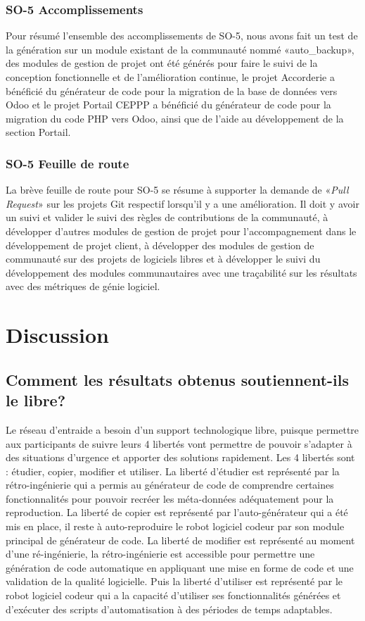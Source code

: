 \subsubsection{SO-5 Accomplissements}
Pour résumé l'ensemble des accomplissements de SO-5, nous avons fait un test de la génération sur un module existant de la communauté nommé «auto\_backup», des modules de gestion de projet ont été générés pour faire le suivi de la conception fonctionnelle et de l’amélioration continue, le projet Accorderie a bénéficié du générateur de code pour la migration de la base de données vers Odoo et le projet Portail CEPPP a bénéficié du générateur de code pour la migration du code PHP vers Odoo, ainsi que de l’aide au développement de la section Portail.

\subsubsection{SO-5 Feuille de route}
La brève feuille de route pour SO-5 se résume à supporter la demande de «\textit{Pull Request}» sur les projets Git respectif lorsqu’il y a une amélioration. Il doit y avoir un suivi et valider le suivi des règles de contributions de la communauté, à développer d’autres modules de gestion de projet pour l’accompagnement dans le développement de projet client, à développer des modules de gestion de communauté sur des projets de logiciels libres et à développer le suivi du développement des modules communautaires avec une traçabilité sur les résultats avec des métriques de génie logiciel.

\section{Discussion}

\subsection{Comment les résultats obtenus soutiennent-ils le libre?}
Le réseau d’entraide a besoin d’un support technologique libre, puisque permettre aux participants de suivre leurs 4 libertés vont permettre de pouvoir s’adapter à des situations d’urgence et apporter des solutions rapidement. Les 4 libertés sont : étudier, copier, modifier et utiliser. La liberté d'étudier est représenté par la rétro-ingénierie qui a permis au générateur de code de comprendre certaines fonctionnalités pour pouvoir recréer les méta-données adéquatement pour la reproduction. La liberté de copier est représenté par l’auto-générateur qui a été mis en place, il reste à auto-reproduire le robot logiciel codeur par son module principal de générateur de code. La liberté de modifier est représenté au moment d'une ré-ingénierie, la rétro-ingénierie est accessible pour permettre une génération de code automatique en appliquant une mise en forme de code et une validation de la qualité logicielle. Puis la liberté d'utiliser est représenté par le robot logiciel codeur qui a la capacité d’utiliser ses fonctionnalités générées et d’exécuter des scripts d’automatisation à des périodes de temps adaptables.


